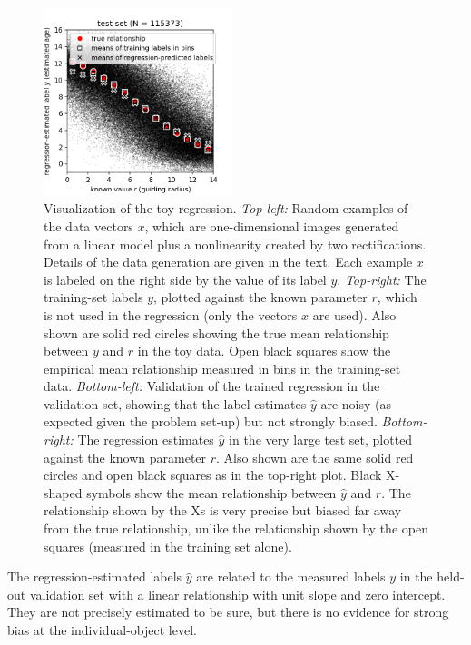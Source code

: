 \documentclass[11pt]{article}
\begin{document}
\begin{figure}[p!]
\includegraphics[width=0.49\textwidth]{notebooks/test_data_results.png}
\caption{\sffamily%
Visualization of the toy regression. \textsl{Top-left:} Random examples of the data vectors $x$, which are one-dimensional images generated from a linear model plus a nonlinearity created by two rectifications. Details of the data generation are given in the text. Each example $x$ is labeled on the right side by the value of its label $y$. \textsl{Top-right:} The training-set labels $y$, plotted against the known parameter $r$, which is not used in the regression (only the vectors $x$ are used). Also shown are solid red circles showing the true mean relationship between $y$ and $r$ in the toy data. Open black squares show the empirical mean relationship measured in bins in the training-set data. \textsl{Bottom-left:} Validation of the trained regression in the validation set, showing that the label estimates $\hat{y}$ are noisy (as expected given the problem set-up) but not strongly biased. \textsl{Bottom-right:} The regression estimates $\hat{y}$ in the very large test set, plotted against the known parameter $r$. Also shown are the same solid red circles and open black squares as in the top-right plot. Black X-shaped symbols show the mean relationship between $\hat{y}$ and $r$. The relationship shown by the Xs is very precise but biased far away from the true relationship, unlike the relationship shown by the open squares (measured in the training set alone).\label{fig:regression}}
\end{figure}

The regression-estimated labels $\hat{y}$ are related to the measured labels $y$ in the held-out validation set with a linear relationship with unit slope and zero intercept.
They are not precisely estimated to be sure, but there is no evidence for strong bias at the individual-object level.
\end{document}

